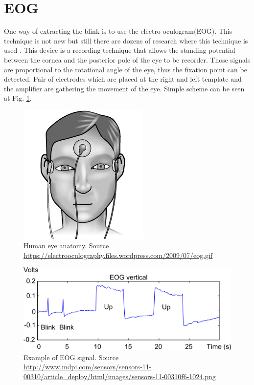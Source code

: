 \documentclass[conference]{IEEEtran}
\newcommand{\Ref}[1]{Fig. \ref{#1}}
\begin{document}
\section{EOG}
One way of extracting the blink is to use the electro-oculogram(EOG). This technique is not new but still there are dozens of research where this technique is used \cite{YagiKunoKogaMukai2006,DenneyDenney1984}. This device is a recording technique that allows the standing potential between the cornea and the posterior pole of the eye to be recorder. Those signals are proportional to the rotational angle of the eye, thus the fixation  point can be detected. Pair of electrodes which are placed at the right and left template and the amplifier are gathering the movement of the eye. Simple scheme can be seen at \Ref{fig:eog}.
\begin{figure}[!h]
	\center
	\includegraphics[scale = 0.6]{eog.jpg}
	\caption{Human eye anatomy. Source \url{https://electrooculography.files.wordpress.com/2009/07/eog.gif} }
	\label{fig:eog}
\end{figure}
\begin{figure}[!h]
	\center
	\includegraphics[scale = 0.25]{eog_signal.png}
	\caption{Example of EOG signal. Source \url{http://www.mdpi.com/sensors/sensors-11-00310/article_deploy/html/images/sensors-11-00310f6-1024.png} }
	\label{fig:eog_signal}
\end{figure}
\end{document}
